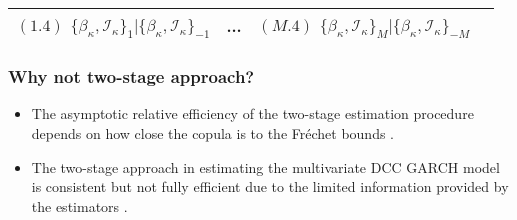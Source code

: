 \documentclass[10pt]{beamer}
\begin{document}
\begin{frame}[allowframebreaks]
\begin{itemize}
\begin{table}
{\begin{tabular}{llll}
                                                                                                                                                                                                                                                                                                                                                                                                                                                                                                                                                                                                                                                          $(1.4)$ $\{\beta_{\kappa},\mathcal{I}_{\kappa}\}_{1}|\{\beta_{\kappa},\mathcal{I}_{\kappa}\}_{-1}$  & ...  & $(M.4)$ $\{\beta_{\kappa},\mathcal{I}_{\kappa}\}_{M}|\{\beta_{\kappa},\mathcal{I}_{\kappa}\}_{-M}$  & \tabularnewline
                                                                                                                                                                                                                                                                                                                                                                                                                                                                                                                                                                                                                                                                                                                                                                                                                                                                             \bottomrule
      \end{tabular}
    }
  \end{table}
\end{itemize}

\end{frame}


\begin{frame}
  \frametitle{Why not two-stage approach?}
  \begin{itemize}
  \item The asymptotic relative efficiency of the two-stage estimation procedure depends
    on how close the copula is to the Fr\'echet bounds
    {\citep{joe2005asymptotic}}.
  \item The two-stage approach in estimating the multivariate DCC GARCH model is
    consistent but not fully efficient due to the limited information provided by the
    estimators {\citep{engle2001theoretical}}.
  \end{itemize}
\end{frame}
\end{document}

